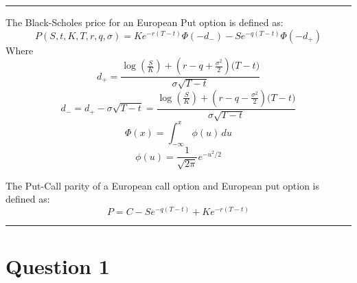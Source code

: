 \documentclass[letterpaper,10pt]{article}
\begin{document}
	 \newline
	 \newline
	 \newline
	\newline \hrule

	The Black-Scholes price for an European Put option is defined as:
	\[
		P(S, t, K, T, r, q, \sigma) = Ke^{-r(T - t)} \Phi(-d_{-}) - Se^{-q(T - t)} \Phi(-d_{+})
	\]
	Where
	\[
		d_{+} = \frac{\log \left(\frac{S}{K}\right) + \left(r-q+\frac{\sigma^2}{2}\right) \big(T-t\big)}{\sigma\sqrt{T-t}}
	\]
	\[
		d_{-} = d_{+} - \sigma\sqrt{T-t} = \frac{\log \left(\frac{S}{K}\right) + \left(r-q-\frac{\sigma^2}{2}\right) \big(T-t\big)}{\sigma\sqrt{T-t}}
	\]
	\[
		\Phi(x) = \int_{-\infty}^{x} \phi(u) \, du
	\]
	\[
		\phi(u) = \frac{1}{\sqrt{2\pi}}e^{-u^2/2}
	\]

	The Put-Call parity of a European call option and European put option is defined as:
	\[
		P = C - Se^{-q(T-t)} + Ke^{-r(T-t)}
	\]

	\hrule

	\section{Question 1}
\end{document}
